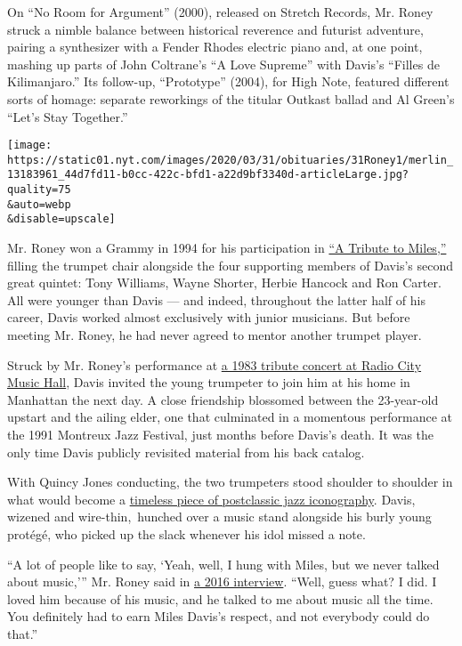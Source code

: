 On ``No Room for Argument'' (2000), released on Stretch Records, Mr.
Roney struck a nimble balance between historical reverence and futurist
adventure, pairing a synthesizer with a Fender Rhodes electric piano
and, at one point, mashing up parts of John Coltrane's ``A Love
Supreme'' with Davis's ``Filles de Kilimanjaro.'' Its follow-up,
``Prototype'' (2004), for High Note, featured different sorts of homage:
separate reworkings of the titular Outkast ballad and Al Green's ``Let's
Stay Together.''

\texttt{[image: https://static01.nyt.com/images/2020/03/31/obituaries/31Roney1/merlin\_13183961\_44d7fd11-b0cc-422c-bfd1-a22d9bf3340d-articleLarge.jpg?quality=75\\\&auto=webp\\\&disable=upscale]}

Mr. Roney won a Grammy in 1994 for his participation in
\href{https://www.youtube.com/watch?v=r_DJJyJ5Ogg\&feature=emb_title}{``A
Tribute to Miles,''} filling the trumpet chair alongside the four
supporting members of Davis's second great quintet: Tony Williams, Wayne
Shorter, Herbie Hancock and Ron Carter. All were younger than Davis ---
and indeed, throughout the latter half of his career, Davis worked
almost exclusively with junior musicians. But before meeting Mr. Roney,
he had never agreed to mentor another trumpet player.

Struck by Mr. Roney's performance at
\href{https://www.nytimes.com/1983/11/09/arts/concert-davis-tribute.html}{a
1983 tribute concert at Radio City Music Hall}, Davis invited the young
trumpeter to join him at his home in Manhattan the next day. A close
friendship blossomed between the 23-year-old upstart and the ailing
elder, one that culminated in a momentous performance at the 1991
Montreux Jazz Festival, just months before Davis's death. It was the
only time Davis publicly revisited material from his back catalog.

With Quincy Jones conducting, the two trumpeters stood shoulder to
shoulder in what would become a
\href{https://www.facebook.com/JazzImprovisers/photos/a.969266783184007/1194385580672125/?type=1\&theater}{timeless
piece of postclassic jazz iconography}. Davis, wizened and
wire-thin,~hunched over a music stand alongside his burly young protégé,
who picked up the slack whenever his idol missed a note.

``A lot of people like to say, `Yeah, well, I hung with Miles, but we
never talked about music,''' Mr. Roney said in
\href{https://www.youtube.com/watch?v=8cxUYcUbdBg}{a 2016 interview}.
``Well, guess what? I did. I loved him because of his music, and he
talked to me about music all the time. You definitely had to earn Miles
Davis's respect, and not everybody could do that.''

